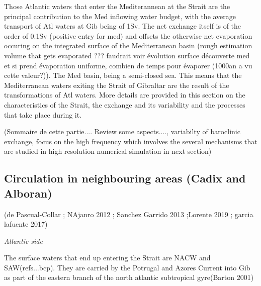 Those Atlantic waters that enter the Mediterannean at the Strait are the principal contribution to the Med inflowing water budget, with the average transport of Atl waters at Gib being of 1Sv. The net exchange itself is of the order of 0.1Sv (positive entry for med) and offsets the otherwise net evaporation occuring on the integrated surface of the Mediterranean basin (rough estimation volume that gets evaporated ??? faudrait voir évolution surface découverte med et si prend évaporation uniforme, combien de temps pour évaporer (1000an a vu cette valeur?)). The Med basin, being a semi-closed sea. This means that the Mediterranean waters exiting the Strait of Gibraltar are the result of the transformations of Atl waters.
More details are provided in this section on the characteristics of the Strait, the exchange and its variability and the processes that take place during it.



(Sommaire de cette partie.... Review some aspects...., variabilty of baroclinic exchange, focus on the high frequency which involves the several mechanisms that are studied in high resolution numerical simulation in next section)







\subsection{Circulation in neighbouring areas (Cadix and Alboran)}

(de Pascual-Collar ; NAjanro 2012 ; Sanchez Garrido 2013 ;Lorente 2019 ; garcia lafuente 2017)


\textit{Atlantic side}

The surface waters that end up entering the Strait are NACW and SAW(refs...bcp). They are carried by the Potrugal and Azores Current into Gib as part of the eastern branch of the north atlantic subtropical gyre(Barton 2001)

